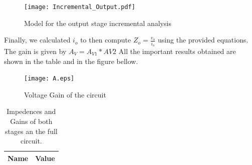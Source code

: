 \begin{figure}[h] \centering
\texttt{[image: Incremental\_Output.pdf]}
\caption{Model for the output stage incremental analysis}
\label{s}
\end{figure}



Finally, we calculated $i_o$ to then compute $Z_o=\frac{v_{o}}{i_o}$ using the provided equations. The gain is given by $A_V = A_{V1}*{AV2}$
All the important results obtained are shown in the table and in the figure bellow. 


\begin{figure}[h] \centering
\texttt{[image: A.eps]}
\caption{Voltage Gain of the circuit}
\label{sh}
\end{figure}


\begin{table}[ht]
  \centering
  \begin{tabular}{|l|r|}
    \hline    
    {\bf Name} & {\bf Value} \\ \hline
    
  \end{tabular}
  \caption{Impedences and Gains of both stages an the full circuit.}
  \label{tab:p2}
\end{table}


















